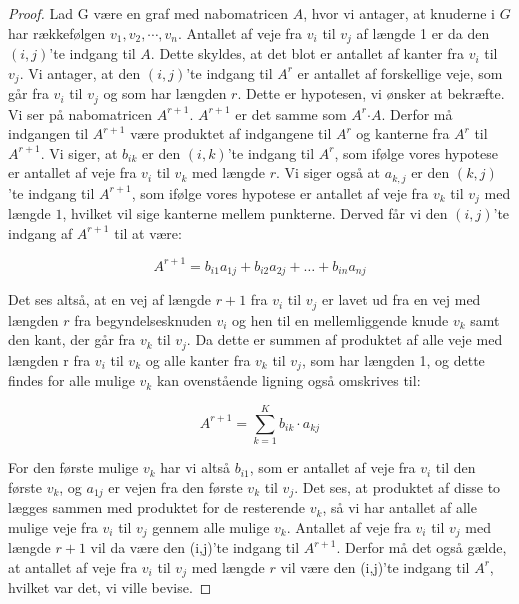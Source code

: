 \begin{proof}
Lad G være en graf med nabomatricen 
\textbf{$A$}, hvor vi antager, at knuderne i $G$ har rækkefølgen $v_{1},v_{2},\cdots,v_{n}$. Antallet af veje fra $v_{i}$ til $v_{j}$ af længde 1 er da den $(i,j)$'te indgang til 
\textbf{$A$}. Dette skyldes, at det blot er antallet af kanter fra $v_{i}$ til $v_{j}$.
Vi antager, at den $(i,j)$'te indgang til 
\textbf{${A^r}$} er antallet af forskellige veje, som går fra $v_{i}$ til $v_{j}$ og som har længden $r$. Dette er hypotesen, vi ønsker at bekræfte.
Vi ser på nabomatricen \textbf{$A^{r+1}$}. 
\textbf{$A^{r+1}$} er det samme som 
\textbf{$A^{r}$}$\cdot$\textbf{$A$}. Derfor må indgangen til \textbf{$A^{r+1}$} være produktet af indgangene til \textbf{$A^{r}$} og kanterne fra \textbf{$A^{r}$} til \textbf{$A^{r+1}$}. Vi siger, at $b_{ik}$ er den $(i,k)$'te indgang til 
\textbf{$A^{r}$}, som ifølge vores hypotese er antallet af veje fra $v_{i}$ til $v_{k}$ med længde $r$. Vi siger også at $a_{k,j}$ er den $(k,j)$'te indgang til 
\textbf{$A^{r+1}$}, som ifølge vores hypotese er antallet af veje fra $v_{k}$ til $v_{j}$ med længde $1$, hvilket vil sige kanterne mellem punkterne. Derved får vi den $(i,j)$'te indgang af \textbf{$A^{r+1}$} til at være: 

\begin{equation*}
A^{r+1}=b_{i1}a_{1j} + b_{i2}a_{2j} +\dotsc+ b_{in}a_{nj}
\end{equation*}

Det ses altså, at en vej af længde $r + 1$ fra $v_{i}$ til $v_{j}$ er lavet ud fra en vej med længden $r$ fra begyndelsesknuden $v_{i}$ og hen til en mellemliggende knude $v_{k}$ samt den kant, der går fra $v_{k}$ til $v_{j}$. 
Da dette er summen af produktet af alle veje med længden r fra $v_{i}$ til $v_{k}$ og alle kanter fra $v_{k}$ til $v_{j}$, som har længden 1, og dette findes for alle mulige $v_{k}$ kan ovenstående ligning også omskrives til: 

\begin{equation*}
A^{r+1}=\sum_{k=1}^{K} b_{ik}\cdot a_{kj}
\end{equation*}

For den første mulige $v_{k}$ har vi altså $b_{i1}$, som er antallet af veje fra $v_{i}$ til den første $v_{k}$, og $a_{1j}$ er vejen fra den første $v_{k}$ til $v_{j}$. Det ses, at produktet af disse to lægges sammen med produktet for de resterende $v_{k}$, så vi har antallet af alle mulige veje fra $v_{i}$ til $v_{j}$ gennem alle mulige $v_{k}$. Antallet af veje fra $v_{i}$ til $v_{j}$ med længde $r+1$ vil da være den (i,j)'te indgang til $A^{r+1}$. Derfor må det også gælde, at antallet af veje fra $v_{i}$ til $v_{j}$ med længde $r$ vil være den (i,j)'te indgang til $A^{r}$, hvilket var det, vi ville bevise.

\end{proof}


